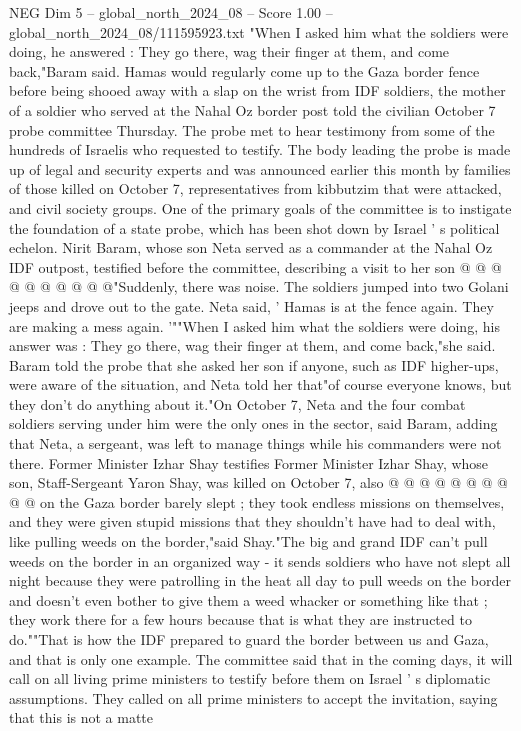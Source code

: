 \begin{textsample}{NEG Dim 5 – global\_north\_2024\_08 – Score 1.00 – global\_north\_2024\_08/111595923.txt}  \label{ex:f5_neg_074}
"When I asked him what the soldiers were doing, he answered : They go there, wag their finger at them, and come back,"Baram said.
Hamas would regularly come up to the Gaza border fence before being shooed away with a slap on the wrist from IDF soldiers, the mother of a soldier who served at the Nahal Oz border post told the civilian October 7 probe committee Thursday.
The probe met to hear testimony from some of the hundreds of Israelis who requested to testify.
The body leading the probe is made up of legal and security experts and was announced earlier this month by families of those killed on October 7, representatives from kibbutzim that were attacked, and civil society groups.
One of the primary goals of the committee is to instigate the foundation of a state probe, which has been shot down by Israel ' s political echelon.
Nirit Baram, whose son Neta served as a commander at the Nahal Oz IDF outpost, testified before the committee, describing a visit to her son @ @ @ @ @ @ @ @ @ @"Suddenly, there was noise.
The soldiers jumped into two Golani jeeps and drove out to the gate.
Neta said, ' Hamas is at the fence again.
They are making a mess again. '""When I asked him what the soldiers were doing, his answer was : They go there, wag their finger at them, and come back,"she said.
Baram told the probe that she asked her son if anyone, such as IDF higher-ups, were aware of the situation, and Neta told her that"of course everyone knows, but they don't do anything about it."On October 7, Neta and the four combat soldiers serving under him were the only ones in the sector, said Baram, adding that Neta, a sergeant, was left to manage things while his commanders were not there.
Former Minister Izhar Shay testifies Former Minister Izhar Shay, whose son, Staff-Sergeant Yaron Shay, was killed on October 7, also @ @ @ @ @ @ @ @ @ @ on the Gaza border barely slept ; they took endless missions on themselves, and they were given stupid missions that they shouldn't have had to deal with, like pulling weeds on the border,"said Shay."The big and grand IDF can't pull weeds on the border in an organized way - it sends soldiers who have not slept all night because they were patrolling in the heat all day to pull weeds on the border and doesn't even bother to give them a weed whacker or something like that ; they work there for a few hours because that is what they are instructed to do.""That is how the IDF prepared to guard the border between us and Gaza, and that is only one example.
The committee said that in the coming days, it will call on all living prime ministers to testify before them on Israel ' s diplomatic assumptions.
They called on all prime ministers to accept the invitation, saying that this is not a matte

\end{textsample}
